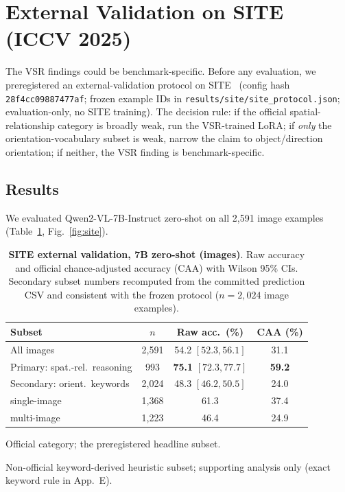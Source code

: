 \section{External Validation on SITE (ICCV 2025)}
\label{sec:site}

The VSR findings could be benchmark-specific. Before any evaluation, we
preregistered an external-validation protocol on SITE~\cite{wang2025site}
(config hash \texttt{28f4cc09887477af}; frozen example IDs in
\texttt{results/site/site\_protocol.json}; evaluation-only, no SITE training).
The decision rule: if the official spatial-relationship category is broadly
weak, run the VSR-trained LoRA; if \emph{only} the orientation-vocabulary subset
is weak, narrow the claim to object/direction orientation; if neither, the VSR
finding is benchmark-specific.

\subsection{Results}
We evaluated Qwen2-VL-7B-Instruct zero-shot on all 2{,}591 image examples
(Table~\ref{tab:site}, Fig.~\ref{fig:site}).

\begin{table}[t]
\centering
\footnotesize
\setlength{\tabcolsep}{2.3pt}
\begin{threeparttable}
\caption{\textbf{SITE external validation, 7B zero-shot (images)}. Raw
accuracy and official chance-adjusted accuracy (CAA) with Wilson 95\% CIs.
Secondary subset numbers recomputed from the committed prediction CSV and
consistent with the frozen protocol ($n{=}2{,}024$ image examples).}
\label{tab:site}
\begin{tabular}{lccc}
\toprule
Subset & $n$ & Raw acc.\ (\%) & CAA (\%) \\
\midrule
All images & 2{,}591 & 54.2 $[52.3, 56.1]$ & 31.1 \\
Primary: spat.-rel.\ reasoning\tnote{a} & 993 & \textbf{75.1} $[72.3, 77.7]$ & \textbf{59.2} \\
Secondary: orient.\ keywords\tnote{b} & 2{,}024 & 48.3 $[46.2, 50.5]$ & 24.0 \\
\midrule
single-image & 1{,}368 & 61.3 & 37.4 \\
multi-image & 1{,}223 & 46.4 & 24.9 \\
\bottomrule
\end{tabular}
\begin{tablenotes}\footnotesize
\item[a] Official category; the preregistered headline subset.
\item[b] Non-official keyword-derived heuristic subset; supporting analysis
only (exact keyword rule in App.~E).
\end{tablenotes}
\end{threeparttable}
\end{table}

